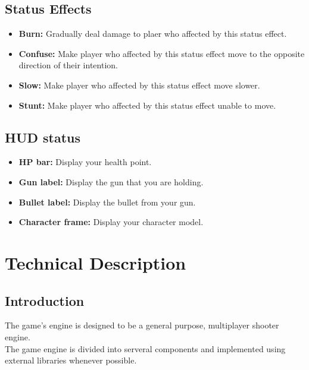 \documentclass{article}
\begin{document}
\hypertarget{status-effects}{%
\subsection{Status Effects}\label{status-effects}}

\begin{itemize}
\item
  \textbf{Burn:} Gradually deal damage to plaer who affected by this
  status effect.
\item
  \textbf{Confuse:} Make player who affected by this status effect move
  to the opposite direction of their intention.
\item
  \textbf{Slow:} Make player who affected by this status effect move
  slower.
\item
  \textbf{Stunt:} Make player who affected by this status effect unable
  to move.
\end{itemize}

\hypertarget{hud-status}{%
\subsection{HUD status}\label{hud-status}}

\begin{itemize}
\item
  \textbf{HP bar:} Display your health point.
\item
  \textbf{Gun label:} Display the gun that you are holding.
\item
  \textbf{Bullet label:} Display the bullet from your gun.
\item
  \textbf{Character frame:} Display your character model.
\end{itemize}

\hypertarget{technical-description}{%
\section{Technical Description}\label{technical-description}}

\hypertarget{introduction-1}{%
\subsection{Introduction}\label{introduction-1}}

The game's engine is designed to be a general purpose, multiplayer
shooter engine.\\
The game engine is divided into serveral components and implemented
using external libraries whenever possible.
\end{document}
